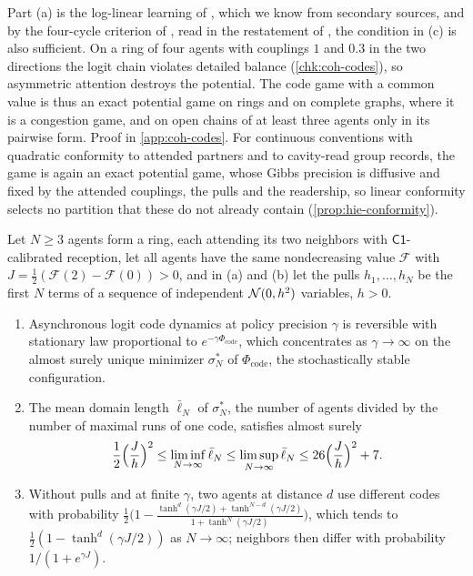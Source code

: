 Part (a) is the log-linear learning of \citet{blume1993statistical}, which we know from secondary sources, and by the four-cycle criterion of \citet[Theorem~2.8]{monderer1996potential}, read in the restatement of \citet{arefizadeh2024characterizations}, the condition in (c) is also sufficient. On a ring of four agents with couplings $1$ and $0.3$ in the two directions the logit chain violates detailed balance (\cref{chk:coh-codes}), so asymmetric attention destroys the potential. The code game with a common value is thus an exact potential game on rings and on complete graphs, where it is a congestion game, and on open chains of at least three agents only in its pairwise form. Proof in \cref{app:coh-codes}. For continuous conventions with quadratic conformity to attended partners and to cavity-read group records, the game is again an exact potential game, whose Gibbs precision is diffusive and fixed by the attended couplings, the pulls and the readership, so linear conformity selects no partition that these do not already contain (\cref{prop:hie-conformity}).

\begin{theorem}\label{thm:coh-domains-1d}
Let $N\ge3$ agents form a ring, each attending its two neighbors with $\mathsf{C1}$-calibrated reception, let all agents have the same nondecreasing value $\mathcal F$ with $J=\frac12(\mathcal F(2)-\mathcal F(0))>0$, and in (a) and (b) let the pulls $h_1,\dots,h_N$ be the first $N$ terms of a sequence of independent $\mathcal{N}(0,h^2)$ variables, $h>0$.
\begin{enumerate}\renewcommand{\labelenumi}{(\alph{enumi})}
\item Asynchronous logit code dynamics at policy precision $\gamma$ is reversible with stationary law proportional to $e^{-\gamma\Phi_{\mathrm{code}}}$, which concentrates as $\gamma\to\infty$ on the almost surely unique minimizer $\sigma^\ast_N$ of $\Phi_{\mathrm{code}}$, the stochastically stable configuration.
\item The mean domain length $\bar\ell_N$ of $\sigma^\ast_N$, the number of agents divided by the number of maximal runs of one code, satisfies almost surely
\[ \frac12\Bigl(\frac Jh\Bigr)^2\le\liminf_{N\to\infty}\bar\ell_N\le\limsup_{N\to\infty}\bar\ell_N\le26\Bigl(\frac Jh\Bigr)^2+7. \]
\item Without pulls and at finite $\gamma$, two agents at distance $d$ use different codes with probability $\frac12\bigl(1-\frac{\tanh^d(\gamma J/2)+\tanh^{N-d}(\gamma J/2)}{1+\tanh^N(\gamma J/2)}\bigr)$, which tends to $\frac12(1-\tanh^d(\gamma J/2))$ as $N\to\infty$; neighbors then differ with probability $1/(1+e^{\gamma J})$.
\end{enumerate}
\end{theorem}

